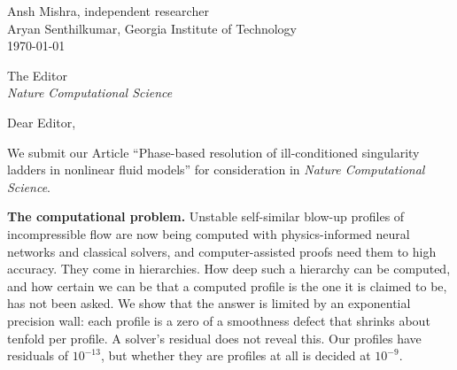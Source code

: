 \documentclass[11pt]{article}
\begin{document}
\begin{flushright}
Ansh Mishra, independent researcher\\
Aryan Senthilkumar, Georgia Institute of Technology\\[0.6em]
\today
\end{flushright}

The Editor\\
\textit{Nature Computational Science}

Dear Editor,

We submit our Article ``Phase-based resolution of ill-conditioned singularity ladders in nonlinear fluid models'' for
consideration in \textit{Nature Computational Science}.

\textbf{The computational problem.} Unstable self-similar blow-up profiles of incompressible flow are now being
computed with physics-informed neural networks and classical solvers, and computer-assisted proofs need them to high
accuracy. They come in hierarchies. How deep such a hierarchy can be computed, and how certain we can be that a
computed profile is the one it is claimed to be, has not been asked. We show that the answer is limited by an
exponential precision wall: each profile is a zero of a smoothness defect that shrinks about tenfold per profile. A
solver's residual does not reveal this. Our profiles have residuals of $10^{-13}$, but whether they are profiles at all
is decided at $10^{-9}$.
\end{document}
